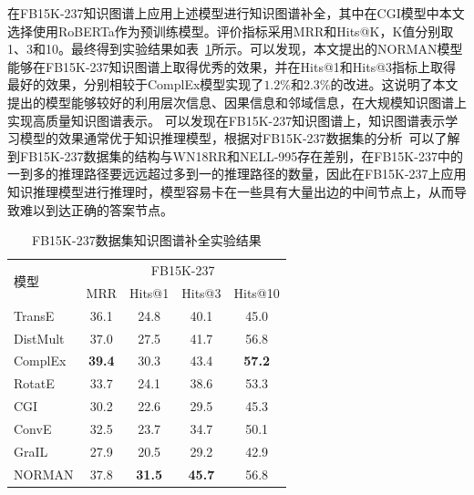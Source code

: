 \documentclass[algorithmlist, AutoFakeBold, AutoFakeSlant, figurelist, tablelist, nomlist, masters]{seuthesix}
\begin{document}
在FB15K-237知识图谱上应用上述模型进行知识图谱补全，其中在CGI模型中本文选择使用RoBERTa作为预训练模型。评价指标采用MRR和Hits@K，K值分别取1、3和10。最终得到实验结果如表~\ref{Experiment1_FB15K-237}所示。可以发现，本文提出的NORMAN模型能够在FB15K-237知识图谱上取得优秀的效果，并在Hits@1和Hits@3指标上取得最好的效果，分别相较于ComplEx模型实现了$1.2\%$和$2.3\%$的改进。这说明了本文提出的模型能够较好的利用层次信息、因果信息和邻域信息，在大规模知识图谱上实现高质量知识图谱表示。
可以发现在FB15K-237知识图谱上，知识图谱表示学习模型的效果通常优于知识推理模型，根据对FB15K-237数据集的分析~\cite{wan2021reasoning}可以了解到FB15K-237数据集的结构与WN18RR和NELL-995存在差别，在FB15K-237中的一到多的推理路径要远远超过多到一的推理路径的数量，因此在FB15K-237上应用知识推理模型进行推理时，模型容易卡在一些具有大量出边的中间节点上，从而导致难以到达正确的答案节点。
\begin{table}[]
  \centering
  \begin{tabular*}{0.95\textwidth}{@{\extracolsep{\fill}}lcccc}
  \toprule[1pt]
  \multirow{2}{*}{模型} & \multicolumn{4}{c}{FB15K-237} \\
    & MRR & Hits@1 & Hits@3 & Hits@10 \\ \hline
  TransE & 36.1 & 24.8 & 40.1 & 45.0 \\
  DistMult & 37.0 & 27.5 & 41.7 & 56.8 \\
  ComplEx & \textbf{39.4} & 30.3 & 43.4 & \textbf{57.2} \\
  RotatE & 33.7 & 24.1 & 38.6  & 53.3 \\
  CGI & 30.2 & 22.6 & 29.5 & 45.3 \\
  ConvE & 32.5 & 23.7 & 34.7 & 50.1 \\
  GraIL & 27.9 & 20.5 & 29.2 & 42.9 \\
  NORMAN & 37.8 & \textbf{31.5} & \textbf{45.7} & 56.8 \\
  \bottomrule[1pt]
  \end{tabular*}
  \caption{FB15K-237数据集知识图谱补全实验结果}
  \label{Experiment1_FB15K-237}
\end{table}
\end{document}
